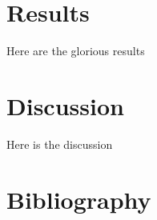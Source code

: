 \documentclass[
  a4paper,
]{scrbook}
\begin{document}
\newpage{}

\chapter{Results}\label{results}

Here are the glorious results

\newpage{}

\chapter{Discussion}\label{discussion}

Here is the discussion

\newpage{}

\chapter*{Bibliography}\label{bibliography}

\begingroup
\raggedright
\end{document}
